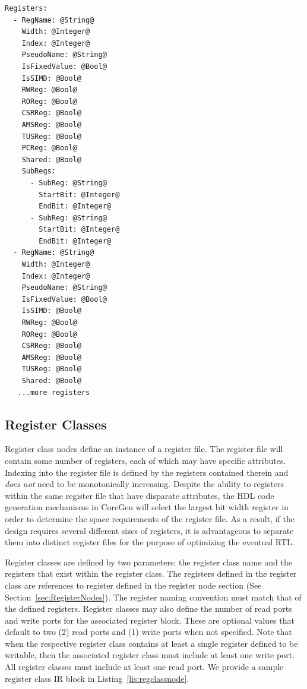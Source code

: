 \documentclass{article}
\begin{document}
\clearpage
\vspace{0.125in}
\begin{lstlisting}[frame=single,style=base,caption={Register Node Definition},captionpos=b,label={lis:registernode}]
Registers:
  - RegName: @String@
    Width: @Integer@
    Index: @Integer@
    PseudoName: @String@
    IsFixedValue: @Bool@
    IsSIMD: @Bool@
    RWReg: @Bool@
    ROReg: @Bool@
    CSRReg: @Bool@
    AMSReg: @Bool@
    TUSReg: @Bool@
    PCReg: @Bool@
    Shared: @Bool@
    SubRegs:
      - SubReg: @String@
        StartBit: @Integer@
        EndBit: @Integer@
      - SubReg: @String@
        StartBit: @Integer@
        EndBit: @Integer@
  - RegName: @String@
    Width: @Integer@
    Index: @Integer@
    PseudoName: @String@
    IsFixedValue: @Bool@
    IsSIMD: @Bool@
    RWReg: @Bool@
    ROReg: @Bool@
    CSRReg: @Bool@
    AMSReg: @Bool@
    TUSReg: @Bool@
    Shared: @Bool@
   ...more registers
\end{lstlisting}  

\clearpage
\subsection{Register Classes}
\label{sec:RegisterClassNodes}

Register class nodes define an instance of a register file.  The register file will contain some number of registers, each of 
which may have specific attributes.  Indexing into the register file is defined by the registers contained therein and \textit{does not} 
need to be monotonically increasing.  Despite the ability to registers within the same register file that have disparate attributes, 
the HDL code generation mechanisms in CoreGen will select the largest bit width register in order to determine the space requirements 
of the register file.  As a result, if the design requires several different sizes of registers, it is advantageous to separate them into distinct 
register files for the purpose of optimizing the eventual RTL.  

Register classes are defined by two parameters: the register class name and the registers that exist within the register class.  The registers 
defined in the register class are references to register defined in the register node section (See Section~\ref{sec:RegisterNodes}).   The 
register naming convention must match that of the defined registers.  Register classes may also define the number of read ports 
and write ports for the associated register block.  These are optional values that default to two (2) read ports and (1) write ports when not specified.  
Note that when the respective register class contains at least a single register defined to be writable, then the associated register class must include at 
least one write port.  All register classes must include at least one read port.  We provide a sample register class 
IR block in Listing~\ref{lis:regclassnode}. 
\end{document}
